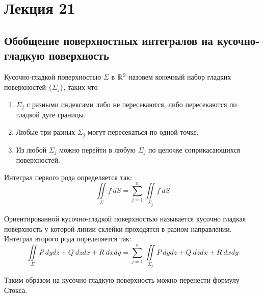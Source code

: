 \section{Лекция 21}
\subsection{Обобщение поверхностных интегралов на кусочно-гладкую поверхность}
\begin{definition}
    Кусочно-гладкой поверхностью $\Sigma$ в $\mathbb{R}^3$ назовем конечный набор гладких поверхностей $\{\Sigma_j\}$, таких что
    \begin{enumerate}
        \item $\Sigma_j$ с разными индексами либо не пересекаются, либо пересекаются по гладкой дуге границы.
        \item Любые три разных $\Sigma_j$ могут пересекаться по одной точке.
        \item Из любой $\Sigma_j$ можно перейти в любую $\Sigma_j$ по цепочке соприкасающихся поверхностей.
    \end{enumerate}
    Интеграл первого рода определяется так:
    \[\iint\limits_{\Sigma}f\ dS =\sum\limits_{j=1}^{n}\iint\limits_{\Sigma_j}f\ dS\]
\end{definition}
\begin{definition}
    Ориентированной кусочно-гладкой поверхностью называется кусочно гладкая поверхность у которой линии склейки проходятся в разном направлении. Интеграл второго рода определяется так:
    \[\iint\limits_{\Sigma}P\ dydz+Q\ dzdx+R\ dxdy=\sum\limits_{j=1}^{n}\iint\limits_{\Sigma_j}P\ dydz+Q\ dzdx+R\ dxdy\]
\end{definition}
\begin{comm}
    Таким образом на кусочно-гладкую поверхность можно перенести формулу Стокса.
\end{comm}
